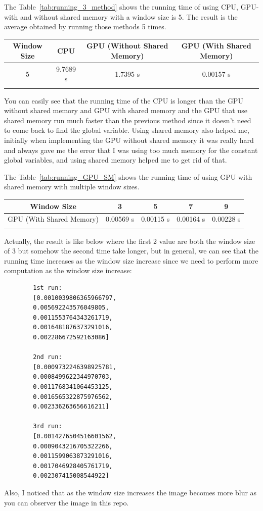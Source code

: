 \documentclass{article}
\begin{document}
	The Table~\ref{tab:running_3_method} shows the running time of using CPU, GPU-with and without shared memory with a window size is 5. The result is the average obtained by running those methods 5 times.
	
	\begin{tabular}{|c|c|c|c|}
		\hline
		Window Size & CPU & GPU (Without Shared Memory) & GPU (With Shared Memory) \\ \hline
		5 & 9.7689 s & 1.7395 s & 0.00157 s \\ \hline
		\label{tab:running_3_method}
	\end{tabular}
	
	You can easily see that the running time of the CPU is longer than the GPU without shared memory and GPU with shared memory and the GPU that use shared memory run much faster than the previous method since it doesn't need to come back to find the global variable. Using shared memory also helped me, initially when implementing the GPU without shared memory it was really hard and always gave me the error that I was using too much memory for the constant global variables, and using shared memory helped me to get rid of that.
	
	The Table~\ref{tab:running_GPU_SM} shows the running time of using GPU with shared memory with multiple window sizes.
	
	\begin{tabular}{|c|c|c|c|c|}
		\hline
		Window Size & 3 & 5 & 7 & 9 \\ \hline
		GPU (With Shared Memory) & 0.00569 s & 0.00115 s & 0.00164 s & 0.00228 s  \\ \hline
		\label{tab:running_3_method}
	\end{tabular}
	
	Actually, the result is like below where the first 2 value are both the window size of 3 but somehow the second time take longer, but in general, we can see that the running time increases as the window size increase since we need to perform more computation as the window size increase:
	\begin{verbatim}
		1st run:
		[0.0010039806365966797,
		0.005692243576049805,
		0.0011553764343261719,
		0.0016481876373291016,
		0.002286672592163086]
		
		2nd run:
		[0.0009732246398925781,
		0.0008499622344970703,
		0.0011768341064453125,
		0.0016565322875976562,
		0.002336263656616211]
		
		3rd run:
		[0.0014276504516601562,
		0.0009043216705322266,
		0.0011599063873291016,
		0.0017046928405761719,
		0.002307415008544922]
	\end{verbatim}
	
	Also, I noticed that as the window size increases the image becomes more blur as you can observer the image in this repo.
	
\end{document}
